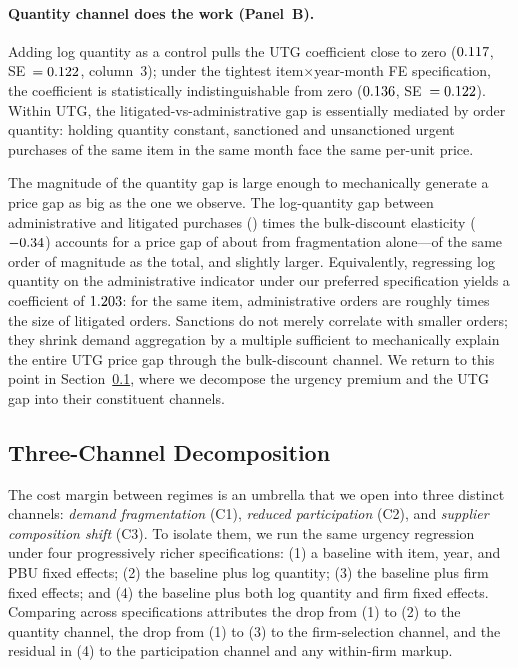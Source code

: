 \paragraph{Quantity channel does the work (Panel~B).}
Adding log quantity as a control pulls the UTG coefficient close to zero ($0.117$, SE~$= 0.122$, column~3); under the tightest item$\times$year-month FE specification, the coefficient is statistically indistinguishable from zero ($0.136$, SE~$= 0.122$). Within UTG, the litigated-vs-administrative gap is essentially mediated by order quantity: holding quantity constant, sanctioned and unsanctioned urgent purchases of the same item in the same month face the same per-unit price.

The magnitude of the quantity gap is large enough to mechanically generate a price gap as big as the one we observe. The log-quantity gap between administrative and litigated purchases (\BPqtyGapAdmLit) times the bulk-discount elasticity ($-0.34$) accounts for a price gap of about \BPqtyImpliedPct{} from fragmentation alone---of the same order of magnitude as the \BPutgPct{} total, and slightly larger. Equivalently, regressing log quantity on the administrative indicator under our preferred specification yields a coefficient of $1.203$: for the same item, administrative orders are roughly \BPutgQtyAdminFoldPref{} times the size of litigated orders. Sanctions do not merely correlate with smaller orders; they shrink demand aggregation by a multiple sufficient to mechanically explain the entire UTG price gap through the bulk-discount channel. We return to this point in Section~\ref{sec:three_channel}, where we decompose the urgency premium and the UTG gap into their constituent channels.

\subsection{Three-Channel Decomposition}
\label{sec:three_channel}

The cost margin between regimes is an umbrella that we open into three distinct channels: \emph{demand fragmentation} (C1), \emph{reduced participation} (C2), and \emph{supplier composition shift} (C3). To isolate them, we run the same urgency regression under four progressively richer specifications: (1) a baseline with item, year, and PBU fixed effects; (2) the baseline plus log quantity; (3) the baseline plus firm fixed effects; and (4) the baseline plus both log quantity and firm fixed effects. Comparing across specifications attributes the drop from (1) to (2) to the quantity channel, the drop from (1) to (3) to the firm-selection channel, and the residual in (4) to the participation channel and any within-firm markup.

